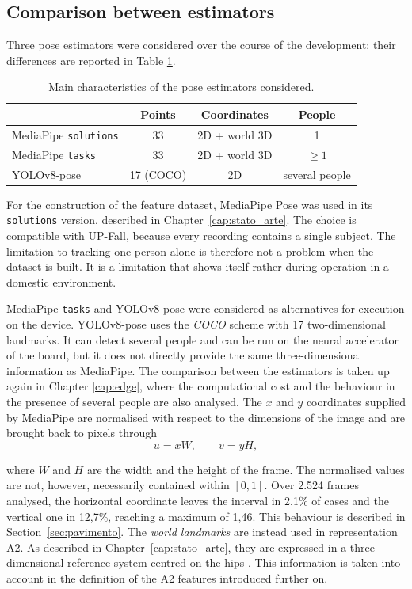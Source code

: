 \subsection{Comparison between estimators}

Three pose estimators were considered over the course of the development; their differences are reported in Table \ref{tab:pose}.

\begin{table}[htbp]
\caption{Main characteristics of the pose estimators considered.}
\label{tab:pose}
\begin{center}
\begin{tabular}{lccc}
\toprule
& \textbf{Points} & \textbf{Coordinates} & \textbf{People} \\
\midrule
MediaPipe \texttt{solutions} & 33 & 2D + world 3D & 1 \\
MediaPipe \texttt{tasks} & 33 & 2D + world 3D & $\geq 1$ \\
YOLOv8-pose & 17 (COCO) & 2D & several people \\
\bottomrule
\end{tabular}
\end{center}
\end{table}

For the construction of the feature dataset, MediaPipe Pose was used in its \texttt{solutions} version, described in Chapter~\ref{cap:stato_arte}. The choice is compatible with UP-Fall, because every recording contains a single subject. The limitation to tracking one person alone is therefore not a problem when the dataset is built. It is a limitation that shows itself rather during operation in a domestic environment.

MediaPipe \texttt{tasks} and YOLOv8-pose were considered as alternatives for execution on the device. YOLOv8-pose uses the \emph{COCO} scheme with 17 two-dimensional landmarks. It can detect several people and can be run on the neural accelerator of the board, but it does not directly provide the same three-dimensional information as MediaPipe. The comparison between the estimators is taken up again in Chapter \ref{cap:edge}, where the computational cost and the behaviour in the presence of several people are also analysed. The $x$ and $y$ coordinates supplied by MediaPipe are normalised with respect to the dimensions of the image and are brought back to pixels through
\[
u=xW,
\qquad
v=yH,
\]

where $W$ and $H$ are the width and the height of the frame. The normalised values are not, however, necessarily contained within $[0,1]$. Over 2.524 frames analysed, the horizontal coordinate leaves the interval in 2,1\% of cases and the vertical one in 12,7\%, reaching a maximum of 1,46. This behaviour is described in Section~\ref{sec:pavimento}. The \emph{world landmarks} are instead used in representation A2. As described in Chapter~\ref{cap:stato_arte}, they are expressed in a three-dimensional reference system centred on the hips \cite{MP}. This information is taken into account in the definition of the A2 features introduced further on.

